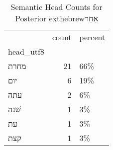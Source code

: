 \begin{table}[htbp!]
\centering
\caption{Semantic Head Counts for Posterior 	exthebrew{אַחַר}}
\label{table:post_MN_head_ct}
\begin{tabular}{lrl}
\toprule
{} &  count & percent \\
head\_utf8 &        &         \\
\midrule
מחרת      &     21 &     66\% \\
יום       &      6 &     19\% \\
עתה       &      2 &      6\% \\
שׁנה      &      1 &      3\% \\
עת        &      1 &      3\% \\
קצת       &      1 &      3\% \\
\bottomrule
\end{tabular}
\end{table}
